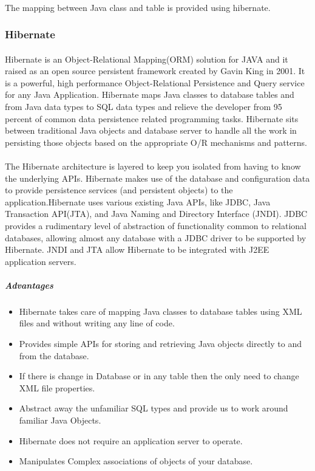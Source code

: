 \paragraph{}
The mapping between Java class and table is provided using hibernate.
\subsubsection{Hibernate}
\paragraph{}
Hibernate is an Object-Relational Mapping(ORM) solution for JAVA and it raised as an open source persistent framework created by Gavin King in 2001. It is a powerful, high performance Object-Relational Persistence and Query service for any Java Application. Hibernate maps Java classes to database tables and from Java data types to SQL data types and relieve the developer from 95 percent of common data persistence related programming tasks. Hibernate sits between traditional Java objects and database server to handle all the work in persisting those objects based on the appropriate O/R mechanisms and patterns.
\paragraph{}
The Hibernate architecture is layered to keep you isolated from having to know the underlying APIs. Hibernate makes use of the database and configuration data to provide persistence services (and persistent objects) to the application.Hibernate uses various existing Java APIs, like JDBC, Java Transaction API(JTA), and Java Naming and Directory Interface (JNDI). JDBC provides a rudimentary level of abstraction of functionality common to relational databases, allowing almost any database with a JDBC driver to be supported by Hibernate. JNDI and JTA allow Hibernate to be integrated with J2EE application servers.
\subparagraph{\textbf{Advantages}}
\begin{itemize}
\item Hibernate takes care of mapping Java classes to database tables using XML files and without writing any line of code.
\item Provides simple APIs for storing and retrieving Java objects directly to and from the database.
\item If there is change in Database or in any table then the only need to change XML file properties.
\item Abstract away the unfamiliar SQL types and provide us to work around familiar Java Objects.
\item Hibernate does not require an application server to operate.
\item Manipulates Complex associations of objects of your database.


\end{itemize}

